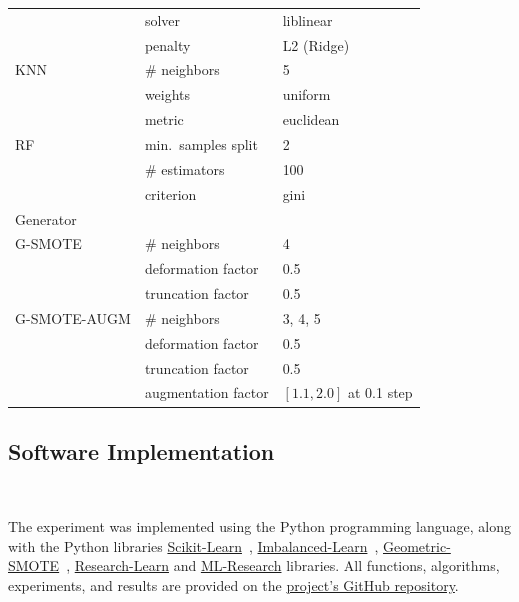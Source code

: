\documentclass[10pt,journal,compsoc]{IEEEtran}
\begin{document}
\begin{table}
\begin{tabular}{lll}
		                & solver                           & liblinear                      \\
                        & penalty                          & L2 (Ridge)                     \\
		KNN             & \# neighbors                     & 5                              \\
                        & weights                          & uniform                        \\
                        & metric                           & euclidean                      \\
		RF              & min.\ samples split              & 2                              \\
		                & \# estimators                    & 100                            \\
                        & criterion                        & gini                           \\
		\toprule
		Generator       &                                  &                                \\
		\midrule
		G-SMOTE         & \# neighbors                     & 4                              \\
                        & deformation factor               & 0.5                            \\
                        & truncation factor                & 0.5                            \\
		G-SMOTE-AUGM    & \# neighbors                     & 3, 4, 5                        \\
                        & deformation factor               & 0.5                            \\
                        & truncation factor                & 0.5                            \\
                        & augmentation factor              & $[1.1, 2.0]$ at 0.1 step       \\
		\bottomrule
	\end{tabular}
\end{table}
 
\subsection{Software Implementation}~\label{sec:software_implementation}

The experiment was implemented using the Python programming language, along
with the Python libraries
\href{https://scikit-learn.org/stable/}{Scikit-Learn}~\cite{Pedregosa2011},
\href{https://imbalanced-learn.org/en/stable/}{Imbalanced-Learn}~\cite{JMLR:v18:16-365},
\href{https://geometric-smote.readthedocs.io/en/latest/?badge=latest}{Geometric-SMOTE}~\cite{Douzas2019},
\href{https://research-learn.readthedocs.io/en/latest/?badge=latest}{Research-Learn}
and
\href{https://mlresearch.readthedocs.io/en/latest/?badge=latest}{ML-Research}
libraries. All functions, algorithms, experiments, and results are provided on
the \href{https://github.com/joaopfonseca/publications/}{project's GitHub
repository}.
\end{document}
